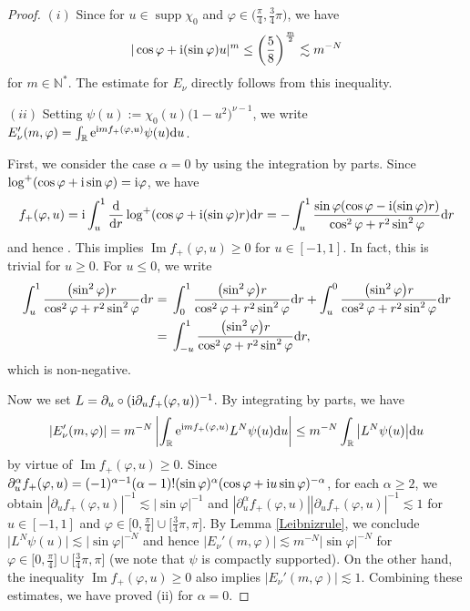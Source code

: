\documentclass[pdftex]{sigma}
\numberwithin{equation}{section}
\def\R{\mathbb{R}}%
\DeclareMathOperator{\supp}{supp}%
\DeclareMathOperator{\im}{Im}%
\def\a{\alpha}
\def\f{\varphi}
\def\g{\psi}
\def\n{\nu}
\def\pa{\partial}
\begin{document}
\begin{proof}
 $(i)$ Since \smash{$|\cos\f+{\rm i}(\sin \f)u|\leq \sqrt{\frac{5}{8}}$} for $u\in \supp \chi_0$ and $\f\in \bigl(\frac{\pi}{4}, \frac{3}{4}\pi\bigr)$, we have
 \[
|\cos\f+{\rm i}(\sin \f)u|^m\leq \left(\frac{5}{8}\right)^{\frac{m}{2}}\lesssim m^{-N}
\]
 for $m\in\mathbb{N}^*$. The estimate for $E_{\n}$ directly follows from this inequality.

 $(ii)$ Setting $\g(u):=\chi_0(u)\bigl(1-u^2\bigr)^{\n-1}$, we write $E_{\n}'(m,\f)=\int_{\R}{\rm e}^{{\rm i}mf_{+}(\f,u)}\g(u){\rm d}u$.

First, we consider the case $\a=0$ by using the integration by parts.
Since $\log^+(\cos \f+{\rm i}\sin \f)={\rm i}\f$, we have
\begin{align}\label{f_+rep}
f_+(\f,u)={\rm i}\int_u^1\frac{{\rm d}}{{\rm d}r}\log^+(\cos \f+{\rm i}(\sin \f) r){\rm d}r=-\int_u^1\frac{\sin\f(\cos \f-{\rm i}(\sin \f) r)}{\cos^2 \f+r^2\sin^2 \f }{\rm d}r
\end{align}
and hence \smash{$\im f_+(\f,u)=\int_u^1\frac{(\sin^2 \f) r}{\cos^2 \f+r^2\sin^2 \f }{\rm d}r$}. This implies $\im f_+(\f,u)\geq 0$ for $u\in [-1,1]$. In fact, this is trivial for $u\geq 0$. For $u\leq 0$, we write
\begin{align*}
\int_u^1\frac{\bigl(\sin^2 \f\bigr) r}{\cos^2 \f+r^2\sin^2 \f }{\rm d}r={}&\int_0^1\frac{\bigl(\sin^2 \f\bigr) r}{\cos^2 \f+r^2\sin^2 \f }{\rm d}r+\int_u^0\frac{\bigl(\sin^2 \f\bigr) r}{\cos^2 \f+r^2\sin^2 \f }{\rm d}r\\
={}&\int_{-u}^1\frac{\bigl(\sin^2 \f\bigr) r}{\cos^2 \f+r^2\sin^2 \f }{\rm d}r,
\end{align*}
 which is non-negative.

Now we set $L=\pa_u\circ ({\rm i}\pa_uf_+(\f,u))^{-1}$. By integrating by parts, we have
\[
|E_{\n}'(m,\f)|=m^{-N}\left|\int_{\R}{\rm e}^{{\rm i}mf_{+}(\f,u)} L^N\g(u){\rm d}u\right|\leq m^{-N}\int_{\R}\big| L^N\g(u)\big|{\rm d}u
\]
 by virtue of $\im f_+(\f,u)\geq 0$. Since $\pa_u^{\a}f_+(\f,u)=(-1)^{\a-1}(\a-1)!(\sin\f)^{\a}(\cos \f+{\rm i}u\sin \f )^{-\a}$, for each $\a\geq 2$, we obtain $|\pa_uf_+(\f,u)|^{-1}\lesssim |\sin \f|^{-1}$ and $|\pa_u^{\a}f_+(\f,u)||\pa_uf_+(\f,u)|^{-1} \lesssim 1$ for $u\in [-1,1]$ and $\f\in \bigl[0,\frac{\pi}{4}\bigr]\cup \bigl[\frac{3}{4}\pi,\pi\bigr]$. By Lemma \ref{Leibnizrule}, we conclude $\big| L^N\g(u)\big|\lesssim |\sin\f|^{-N}$ and hence $|E_{\n}'(m,\f)|\lesssim m^{-N}|\sin\f|^{-N}$ for $\f\in \bigl[0,\frac{\pi}{4}\bigr]\cup \bigl[\frac{3}{4}\pi,\pi\bigr]$ (we note that $\g$ is compactly supported). On the other hand, the inequality $\im f_+(\f,u)\geq 0$ also implies $|E_{\n}'(m,\f)|\lesssim 1$. Combining these estimates, we have proved (ii) for $\a=0$.


\end{proof}
\end{document}
